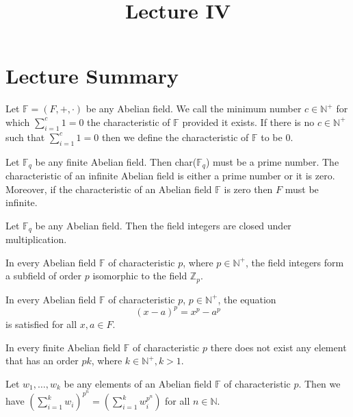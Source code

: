 \documentclass[a4paper]{article}
\title{\vspace{-2cm}Lecture IV\vspace{-2cm}}
\date{}
\begin{document}
\maketitle
\section{Lecture Summary}
\begin{definition}
Let $\mathbb{F} = (F, +, \cdot)$ be any Abelian field. We call the minimum number $c \in \mathbb{N}^{+}$ for which $\sum_{i = 1}^{c} 1 = 0$ the characteristic of $\mathbb{F}$ provided it exists. If there is no $c \in \mathbb{N}^{+}$ such that $\sum_{i=1}^{c} 1 = 0$ then we define the characteristic of $\mathbb{F}$ to be 0.
\end{definition}


\begin{theorem}
Let $\mathbb{F}_{q}$ be any finite Abelian field. Then char($\mathbb{F}_{q}$) must be a prime number. The characteristic of an infinite Abelian field is either a prime number or it is zero. Moreover, if the characteristic of an Abelian field $\mathbb{F}$ is zero then $F$ must be infinite.
\end{theorem}


\begin{corollary}
Let $\mathbb{F}_{q}$ be any Abelian field. Then the field integers are closed under multiplication.
\end{corollary}


\begin{theorem}
In every Abelian field $\mathbb{F}$ of characteristic $p$, where $p \in \mathbb{N}^{+}$, the field integers form a subfield of order $p$ isomorphic to the field $\mathbb{Z}_{p}$.
\end{theorem}


\begin{theorem}
In every Abelian field $\mathbb{F}$ of characteristic $p$, $p \in \mathbb{N}^{+}$, the equation
$$(x - a)^{p} = x^{p} - a^{p}$$
is satisfied for all $x, a \in F$.
\end{theorem}


\begin{corollary}
In every finite Abelian field $\mathbb{F}$ of characteristic $p$ there does not exist any element that has an order $pk$, where $k \in \mathbb{N}^{+}, k > 1$.
\end{corollary}


\begin{corollary}
Let $w_{1}, \ldots, w_{k}$ be any elements of an Abelian field $\mathbb{F}$ of characteristic $p$. Then we have $\left( \sum_{i=1}^{k} w_{i} \right)^{p^{n}} = \left( \sum_{i=1}^{k} w_{i}^{p^{n}} \right)$ for all $n \in \mathbb{N}$.
\end{corollary}
\end{document}
